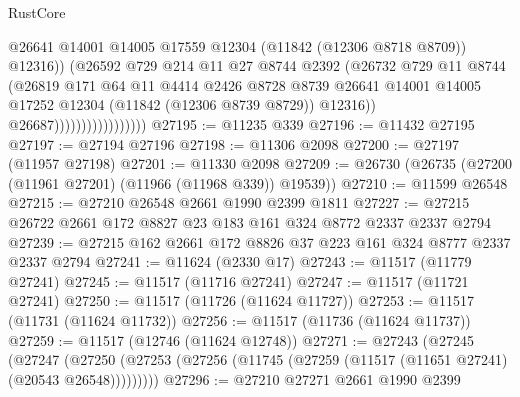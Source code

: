 \begin{lexlean}{RustCore}
\begin{coremodule}
                                        @26641
                                        @14001
                                        @14005
                                        @17559
                                        @12304
                                        (@11842 (@12306 @8718 @8709))
                                        @12316))
                                    (@26592
                                      @729
                                      @214
                                      @11
                                      @27
                                      @8744
                                      @2392
                                      (@26732
                                        @729
                                        @11
                                        @8744
                                        (@26819
                                          @171
                                          @64
                                          @11
                                          @4414
                                          @2426
                                          @8728
                                          @8739
                                          @26641
                                          @14001
                                          @14005
                                          @17252
                                          @12304
                                          (@11842 (@12306 @8739 @8729))
                                          @12316))
                                      @26687)))))))))))))))))
@27195 := @11235 @339
@27196 := @11432 @27195
@27197 := @27194 @27196
@27198 := @11306 @2098
@27200 := @27197 (@11957 @27198)
@27201 := @11330 @2098
@27209 := @26730 (@26735 (@27200 (@11961 @27201) (@11966 (@11968 @339)) @19539))
@27210 := @11599 @26548
@27215 := @27210 @26548 @2661 @1990 @2399 @1811
@27227 := @27215 @26722 @2661 @172 @8827 @23 @183 @161 @324 @8772 @2337 @2337 @2794
@27239 := @27215 @162 @2661 @172 @8826 @37 @223 @161 @324 @8777 @2337 @2337 @2794
@27241 := @11624 (@2330 @17)
@27243 := @11517 (@11779 @27241)
@27245 := @11517 (@11716 @27241)
@27247 := @11517 (@11721 @27241)
@27250 := @11517 (@11726 (@11624 @11727))
@27253 := @11517 (@11731 (@11624 @11732))
@27256 := @11517 (@11736 (@11624 @11737))
@27259 := @11517 (@12746 (@11624 @12748))
@27271 := @27243
    (@27245
      (@27247
        (@27250 (@27253 (@27256 (@11745 (@27259 (@11517 (@11651 @27241) (@20543 @26548)))))))))
@27296 := @27210
    @27271
    @2661
    @1990
    @2399

\end{coremodule}
\end{lexlean}
